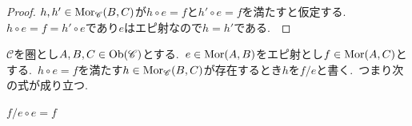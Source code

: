 \begin{proof}
$h,h' \in \operatorname{Mor}_{\mathscr{C}}(B,C)$が$h \circ e = f$と$h' \circ e = f$を満たすと仮定する.\
$h \circ e = f = h' \circ e$であり$e$はエピ射なので$h = h'$である.\
\end{proof}

\begin{definition} \label{def: epiFactor}
$\mathscr{C}$を圏とし$A,B,C \in \operatorname{Ob}(\mathscr{C})$とする.\
$e \in \operatorname{Mor}(A, B)$をエピ射とし$f \in \operatorname{Mor}(A, C)$とする.\
$h \circ e = f$を満たす$h \in \operatorname{Mor}_{\mathscr{C}}(B, C)$が存在するとき$h$を$f / e$と書く.\ つまり次の式が成り立つ.\
\begin{center}
$f / e \circ e = f$
\end{center}
\end{definition}
